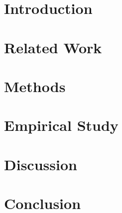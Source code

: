 \documentclass[11pt,a4paper]{article}
\begin{document}
\begin{abstract}
We further extend the synthetic-data framework beyond equities to the CBOE Volatility Index (VIX) and the VXX short-term volatility ETN, showing that the same Baum-Welch pipeline reproduces the distinct statistical properties of volatility measures (positive skewness, pronounced mean reversion, and heavier-than-equity excess kurtosis) and passes the same seven-metric distributional battery used on equity returns.
The result is a single synthetic-data engine that covers both the equity cross-section and the volatility measures most commonly used as risk inputs, in the same spirit as our earlier discrete HMM paper \citep{alswaidan2026hybrid}.
Option pricing and implied-volatility-surface modeling are explicitly out of scope for this paper.

\bigskip\noindent
\textbf{Keywords:} Continuous Hidden Markov Model, Baum-Welch Algorithm, Synthetic Financial Data, Stylized Facts, Volatility Clustering, Regime-Switching, Single Index Model, Copula Dependence, Cross-Asset Simulation, VIX, VXX.
\end{abstract}

\section{Introduction}
\label{sec:introduction}


\section{Related Work}
\label{sec:related}


\section{Methods}
\label{sec:methods}


\section{Empirical Study}
\label{sec:results}


\section{Discussion}
\label{sec:discussion}


\section{Conclusion}
\label{sec:conclusion}

\end{document}
